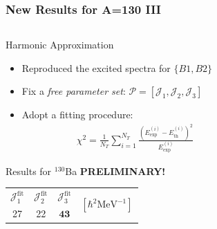 \documentclass{beamer}
\begin{document}
\begin{frame}
  \frametitle{New Results for A=130 III}
  \begin{columns}
    \begin{column}{0.75\textwidth}
      \begin{alertblock}{Harmonic Approximation}
        \begin{itemize}
          \item Reproduced the excited spectra for $\{B1,B2\}$
          \item Fix a \emph{free parameter set}: $\mathcal{P}=\left[\mathcal{J}_1,\mathcal{J}_2,\mathcal{J}_3\right]$
          \item Adopt a fitting procedure:
          \begin{align}
            \chi^2=\frac{1}{N_T}\sum_{i=1}^{N_T}\frac{\left(E_\text{exp}^{(i)}-E_\text{th}^{(i)}\right)^2}{E_\text{exp}^{(i)}}
          \end{align}
        \end{itemize}
      \end{alertblock}
      \begin{exampleblock}{Results for $^{130}$Ba \textbf{PRELIMINARY!}}
        \begin{table}
          \centering
          \begin{tabular}{|c|c|c|c|}
          \hline
          $\mathcal{J}_1^\text{fit}$ & $\mathcal{J}_2^\text{fit}$ & $\mathcal{J}_3^\text{fit}$ & \multirow{2}{*}{$\left[\hbar^2\text{MeV}^{-1}\right]$} \\ \cline{1-3}
          27                         & 22                         & $\mathbf{43}$                         &                                                       \\ \hline
          \end{tabular}
          \end{table}
      \end{exampleblock}
  \end{column}
  \begin{column}{0.25\textwidth}
    \begin{figure}
      \centering

\end{figure}
\end{column}
\end{columns}
\end{frame}
\end{document}
